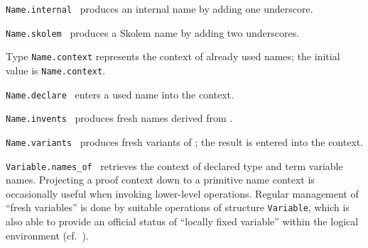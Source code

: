 \begin{isabellebody}
\begin{isamarkuptext}
  \begin{description}

  \item \verb|Name.internal|~ produces an internal name
  by adding one underscore.

  \item \verb|Name.skolem|~ produces a Skolem name by
  adding two underscores.

  \item Type \verb|Name.context| represents the context of already
  used names; the initial value is \verb|Name.context|.

  \item \verb|Name.declare|~ enters a used name into the
  context.

  \item \verb|Name.invents|~ produces  fresh names derived from .

  \item \verb|Name.variants|~ produces fresh
  variants of ; the result is entered into the context.

  \item \verb|Variable.names_of|~ retrieves the context
  of declared type and term variable names.  Projecting a proof
  context down to a primitive name context is occasionally useful when
  invoking lower-level operations.  Regular management of ``fresh
  variables'' is done by suitable operations of structure \verb|Variable|, which is also able to provide an official status of
  ``locally fixed variable'' within the logical environment (cf.\
  ).


\end{description}
\end{isamarkuptext}
\end{isabellebody}
